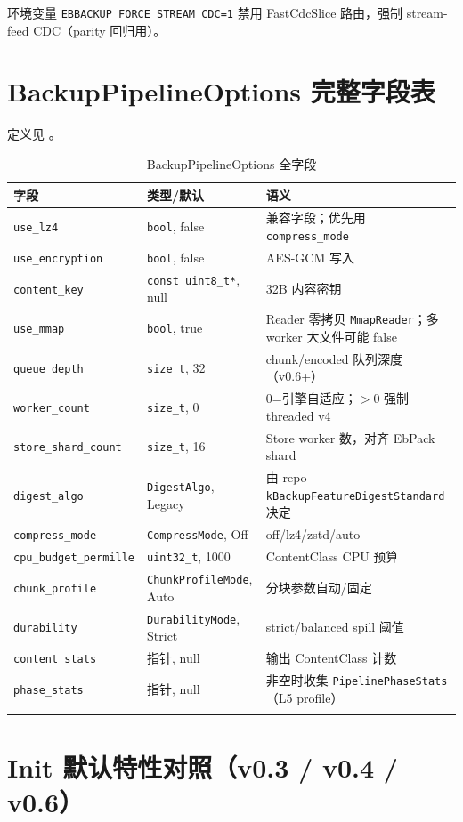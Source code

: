 环境变量 \texttt{EBBACKUP\_FORCE\_STREAM\_CDC=1} 禁用 FastCdcSlice 路由，强制 stream-feed CDC（parity 回归用）。

\section{BackupPipelineOptions 完整字段表}

定义见 。

\begin{longtable}{@{}llp{7.5cm}@{}}
\toprule
字段 & 类型/默认 & 语义 \\
\midrule
\texttt{use\_lz4} & \texttt{bool}, false & 兼容字段；优先用 \texttt{compress\_mode} \\
\texttt{use\_encryption} & \texttt{bool}, false & AES-GCM 写入 \\
\texttt{content\_key} & \texttt{const uint8\_t*}, null & 32B 内容密钥 \\
\texttt{use\_mmap} & \texttt{bool}, true & Reader 零拷贝 \texttt{MmapReader}；多 worker 大文件可能 false \\
\texttt{queue\_depth} & \texttt{size\_t}, 32 & chunk/encoded 队列深度（v0.6+） \\
\texttt{worker\_count} & \texttt{size\_t}, 0 & 0=引擎自适应；$>$0 强制 threaded v4 \\
\texttt{store\_shard\_count} & \texttt{size\_t}, 16 & Store worker 数，对齐 EbPack shard \\
\texttt{digest\_algo} & \texttt{DigestAlgo}, Legacy & 由 repo \texttt{kBackupFeatureDigestStandard} 决定 \\
\texttt{compress\_mode} & \texttt{CompressMode}, Off & off/lz4/zstd/auto \\
\texttt{cpu\_budget\_permille} & \texttt{uint32\_t}, 1000 & ContentClass CPU 预算 \\
\texttt{chunk\_profile} & \texttt{ChunkProfileMode}, Auto & 分块参数自动/固定 \\
\texttt{durability} & \texttt{DurabilityMode}, Strict & strict/balanced spill 阈值 \\
\texttt{content\_stats} & 指针, null & 输出 ContentClass 计数 \\
\texttt{phase\_stats} & 指针, null & 非空时收集 \texttt{PipelinePhaseStats}（L5 profile） \\
\bottomrule
\caption{BackupPipelineOptions 全字段}
\end{longtable}

\section{Init 默认特性对照（v0.3 / v0.4 / v0.6）}

